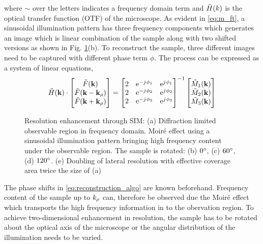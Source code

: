 \documentclass[11pt]{article}
\begin{document}
where $\sim$ over the letters indicates a frequency domain term and $\tilde{H}(k)$ is the optical transfer function (OTF) of the microscope. As evident in \eqref{eq:m_ft}, a sinusoidal illumination pattern has three frequency components which generates an image which is linear combination of the sample along with two shifted versions as shown in Fig. \ref{fig:sim}(b). To reconstruct the sample, three different images need to be captured with different phase term $\phi$. The process can be expressed as a system of linear equations,
%
\begin{equation}
  \tilde{H}(\mathbf{k}) \cdot
  \begin{bmatrix}
    \tilde{F}(\mathbf{k}) \\
    \tilde{F}(\mathbf{k} - \mathbf{k}_{\rho}) \\
    \tilde{F}(\mathbf{k} + \mathbf{k}_{\rho})
  \end{bmatrix}
  =
  \begin{bmatrix}
    2 & \mathrm{e}^{-j\mkern1mu \phi_1} & \mathrm{e}^{j\mkern1mu \phi_1} \\
    2 & \mathrm{e}^{-j\mkern1mu \phi_2} & \mathrm{e}^{j\mkern1mu \phi_2} \\
    2 & \mathrm{e}^{-j\mkern1mu \phi_3} & \mathrm{e}^{j\mkern1mu \phi_3} \\
  \end{bmatrix}^{-1}
  \begin{bmatrix}
   \tilde{M}_1(\mathbf{k}) \\
   \tilde{M}_2(\mathbf{k}) \\
   \tilde{M}_3(\mathbf{k})
  \end{bmatrix}
  \label{eq:reconstruction_algo}
\end{equation}
%
\begin{figure}[t!]
  \def\svgwidth{\linewidth}
  
  \caption{Resolution enhancement through SIM: (a) Diffraction limited observable region in frequency domain.  Moiré effect using a sinusoidal illumination pattern bringing high frequency content under the observable region. The sample is rotated: (b) $0 \degree$, (c) $60 \degree$, (d) $120 \degree$. (e) Doubling of lateral resolution with effective coverage area twice the size of (a)}
  \label{fig:sim}
\end{figure}
%
The phase shifts in \eqref{eq:reconstruction_algo} are known beforehand. Frequency content of the sample up to $k_{\rho}$ can, therefore be observed due the Moiré effect which transports the high frequency information in to the obervation region. To achieve two-dimensional enhancement in resolution, the sample has to be rotated about the optical axis of the microscope or the angular distribution of the illumination needs to be varied.
\end{document}

